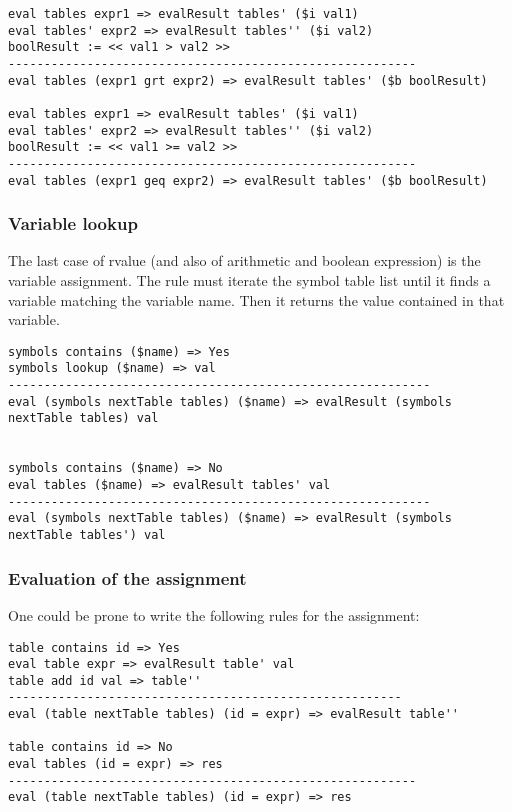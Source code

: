 \begin{lstlisting}
eval tables expr1 => evalResult tables' ($i val1)
eval tables' expr2 => evalResult tables'' ($i val2)
boolResult := << val1 > val2 >>
---------------------------------------------------------
eval tables (expr1 grt expr2) => evalResult tables' ($b boolResult)

eval tables expr1 => evalResult tables' ($i val1)
eval tables' expr2 => evalResult tables'' ($i val2)
boolResult := << val1 >= val2 >>
---------------------------------------------------------
eval tables (expr1 geq expr2) => evalResult tables' ($b boolResult)
\end{lstlisting}

\subsubsection{Variable lookup}
The last case of rvalue (and also of arithmetic and boolean expression) is the variable assignment. The rule must iterate the symbol table list until it finds a variable matching the variable name. Then it returns the value contained in that variable.

\begin{lstlisting}
symbols contains ($name) => Yes
symbols lookup ($name) => val
-----------------------------------------------------------
eval (symbols nextTable tables) ($name) => evalResult (symbols nextTable tables) val


symbols contains ($name) => No
eval tables ($name) => evalResult tables' val
-----------------------------------------------------------
eval (symbols nextTable tables) ($name) => evalResult (symbols nextTable tables') val
\end{lstlisting}

\subsubsection{Evaluation of the assignment}
One could be prone to write the following rules for the assignment:

\begin{lstlisting}
table contains id => Yes
eval table expr => evalResult table' val
table add id val => table''
-------------------------------------------------------
eval (table nextTable tables) (id = expr) => evalResult table'' 

table contains id => No
eval tables (id = expr) => res
---------------------------------------------------------
eval (table nextTable tables) (id = expr) => res
\end{lstlisting}

